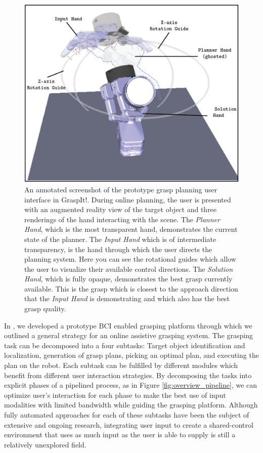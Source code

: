 \begin{figure}
	\centering
	\includegraphics[width=.8\columnwidth]{ui_1.png}
	\caption{An annotated screenshot of the prototype grasp planning user interface in GraspIt!. During online planning, the user is presented with an augmented reality view of the target object and three renderings of the hand interacting with the scene. The \emph{Planner Hand}, which is the most transparent hand, demonstrates the current state of the planner. The \emph{Input Hand} which is of intermediate transparency, is the hand through which the user directs the planning system. Here you can see the rotational guides which allow the user to visualize their available control directions. The \emph{Solution Hand}, which is fully opaque, demonstrates the best grasp currently available. This is the grasp which is closest to the approach direction that the \emph{Input Hand} is demonstrating and which also has the best grasp quality.}
	\label{fig:ui_1}
\end{figure}
\renewcommand*{\theHsection}{chX.\the\value{section}}
In \cite{Weisz2012c}, we developed a prototype BCI enabled grasping platform through which we outlined a general strategy for an online assistive grasping system. 
The grasping task can be decomposed into a four subtasks: Target object identification and localization, generation of grasp plans, picking an optimal plan, and executing the plan on the robot. Each subtask can be fulfilled by different modules which benefit from different user interaction strategies. By decomposing the tasks into explicit phases of a pipelined process, as in Figure \ref{fig:overview_pipeline}, we can optimize user's interaction for each phase to make the best use of input modalities with limited bandwidth while guiding the grasping platform. 
Although fully automated approaches for each of these subtasks have been the subject of extensive and ongoing research, integrating user input to create a shared-control environment that uses as much input as the user is able to supply is still a relatively unexplored field.

